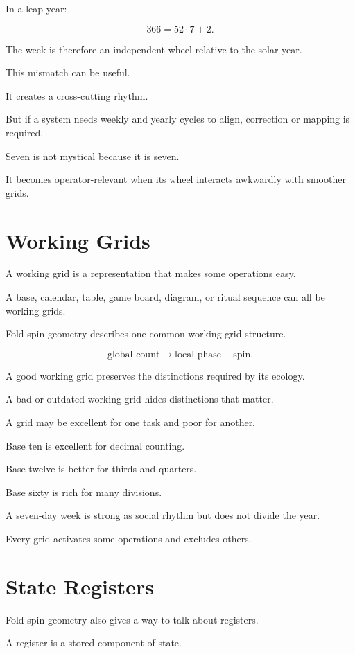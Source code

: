 \documentclass[11pt]{book}
\begin{document}
In a leap year:

\[
366 = 52 \cdot 7 + 2.
\]

The week is therefore an independent wheel relative to the solar year.

This mismatch can be useful.

It creates a cross-cutting rhythm.

But if a system needs weekly and yearly cycles to align, correction or mapping is required.

Seven is not mystical because it is seven.

It becomes operator-relevant when its wheel interacts awkwardly with smoother grids.

\section{Working Grids}

A working grid is a representation that makes some operations easy.

A base, calendar, table, game board, diagram, or ritual sequence can all be working grids.

Fold-spin geometry describes one common working-grid structure.

\[
\text{global count} \rightarrow \text{local phase} + \text{spin}.
\]

A good working grid preserves the distinctions required by its ecology.

A bad or outdated working grid hides distinctions that matter.

A grid may be excellent for one task and poor for another.

Base ten is excellent for decimal counting.

Base twelve is better for thirds and quarters.

Base sixty is rich for many divisions.

A seven-day week is strong as social rhythm but does not divide the year.

Every grid activates some operations and excludes others.

\section{State Registers}

Fold-spin geometry also gives a way to talk about registers.

A register is a stored component of state.
\end{document}

